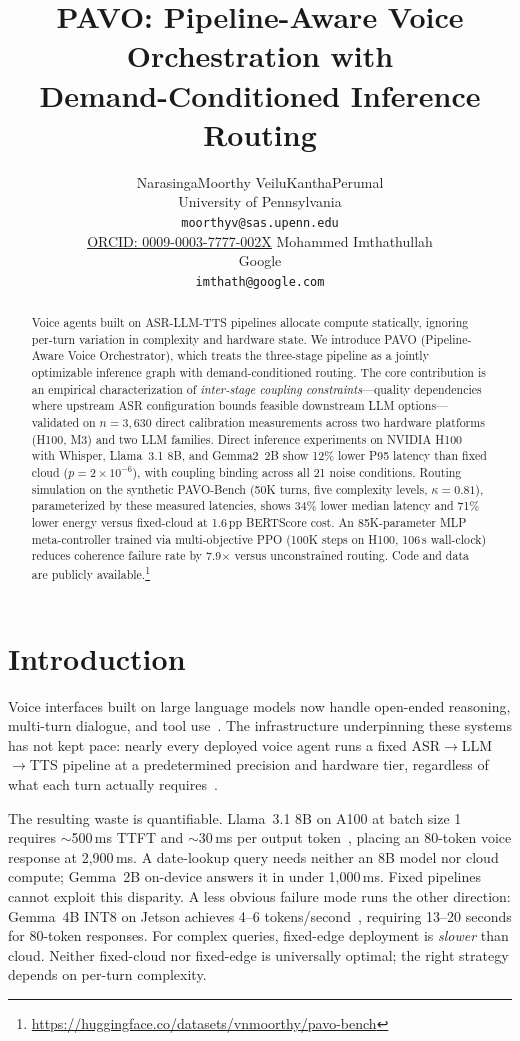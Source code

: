 \documentclass{article}
\title{PAVO: Pipeline-Aware Voice Orchestration with\\Demand-Conditioned Inference Routing}
\author{NarasingaMoorthy VeiluKanthaPerumal \\
University of Pennsylvania \\
\texttt{moorthyv@sas.upenn.edu} \\
\href{https://orcid.org/0009-0003-7777-002X}{ORCID: 0009-0003-7777-002X}
\And
Mohammed Imthathullah \\
Google \\
\texttt{imthath@google.com}}
\begin{document}
\maketitle

\begin{abstract}
Voice agents built on ASR-LLM-TTS pipelines allocate compute statically, ignoring per-turn variation in complexity and hardware state. We introduce PAVO (Pipeline-Aware Voice Orchestrator), which treats the three-stage pipeline as a jointly optimizable inference graph with demand-conditioned routing. The core contribution is an empirical characterization of \emph{inter-stage coupling constraints}---quality dependencies where upstream ASR configuration bounds feasible downstream LLM options---validated on $n=3{,}630$ direct calibration measurements across two hardware platforms (H100, M3) and two LLM families. Direct inference experiments on NVIDIA H100 with Whisper, Llama~3.1 8B, and Gemma2~2B show 12\% lower P95 latency than fixed cloud ($p = 2\times10^{-6}$), with coupling binding across all 21 noise conditions. Routing simulation on the synthetic PAVO-Bench (50K turns, five complexity levels, $\kappa=0.81$), parameterized by these measured latencies, shows 34\% lower median latency and 71\% lower energy versus fixed-cloud at 1.6\,pp BERTScore cost. An 85K-parameter MLP meta-controller trained via multi-objective PPO (100K steps on H100, 106\,s wall-clock) reduces coherence failure rate by 7.9$\times$ versus unconstrained routing. Code and data are publicly available.\footnote{\url{https://huggingface.co/datasets/vnmoorthy/pavo-bench}}
\end{abstract}

\section{Introduction}
\label{sec:intro}

Voice interfaces built on large language models now handle open-ended reasoning, multi-turn dialogue, and tool use~\citep{openai2024gpt4o,dubey2024llama3,team2024gemma2}. The infrastructure underpinning these systems has not kept pace: nearly every deployed voice agent runs a fixed ASR$\to$LLM$\to$TTS pipeline at a predetermined precision and hardware tier, regardless of what each turn actually requires~\citep{oord2016wavenet,ren2021fastspeech,kim2021vits,dettmers2022llmint8,frantar2022gptq,lin2024awq}.

The resulting waste is quantifiable. Llama~3.1 8B on A100 at batch size 1 requires $\sim$500\,ms TTFT and $\sim$30\,ms per output token~\citep{mlperf2025}, placing an 80-token voice response at 2{,}900\,ms. A date-lookup query needs neither an 8B model nor cloud compute; Gemma~2B on-device answers it in under 1{,}000\,ms. Fixed pipelines cannot exploit this disparity. A less obvious failure mode runs the other direction: Gemma~4B INT8 on Jetson achieves 4--6 tokens/second~\citep{song2023powerinfer}, requiring 13--20 seconds for 80-token responses. For complex queries, fixed-edge deployment is \emph{slower} than cloud. Neither fixed-cloud nor fixed-edge is universally optimal; the right strategy depends on per-turn complexity.
\end{document}
